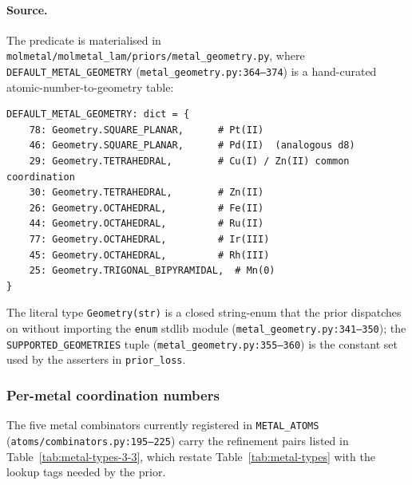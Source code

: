 \paragraph{Source.}
The predicate is materialised in
\texttt{molmetal/molmetal\_lam/priors/metal\_geometry.py}, where
\texttt{DEFAULT\_METAL\_GEOMETRY}
(\texttt{metal\_geometry.py:364--374}) is a hand-curated
atomic-number-to-geometry table:
\begin{verbatim}
DEFAULT_METAL_GEOMETRY: dict = {
    78: Geometry.SQUARE_PLANAR,      # Pt(II)
    46: Geometry.SQUARE_PLANAR,      # Pd(II)  (analogous d8)
    29: Geometry.TETRAHEDRAL,        # Cu(I) / Zn(II) common coordination
    30: Geometry.TETRAHEDRAL,        # Zn(II)
    26: Geometry.OCTAHEDRAL,         # Fe(II)
    44: Geometry.OCTAHEDRAL,         # Ru(II)
    77: Geometry.OCTAHEDRAL,         # Ir(III)
    45: Geometry.OCTAHEDRAL,         # Rh(III)
    25: Geometry.TRIGONAL_BIPYRAMIDAL,  # Mn(0)
}
\end{verbatim}
The literal type \texttt{Geometry(str)} is a closed string-enum
that the prior dispatches on without importing the \texttt{enum}
stdlib module (\texttt{metal\_geometry.py:341--350}); the
\texttt{SUPPORTED\_GEOMETRIES} tuple
(\texttt{metal\_geometry.py:355--360}) is the constant set used by
the asserters in \texttt{prior\_loss}.

\subsubsection{Per-metal coordination numbers}
\label{sec:metal-coord-numbers}

The five metal combinators currently registered in
\texttt{METAL\_ATOMS} (\texttt{atoms/combinators.py:195--225})
carry the refinement pairs listed in
Table~\ref{tab:metal-types-3-3}, which restate
Table~\ref{tab:metal-types} with the lookup tags needed by the
prior.

